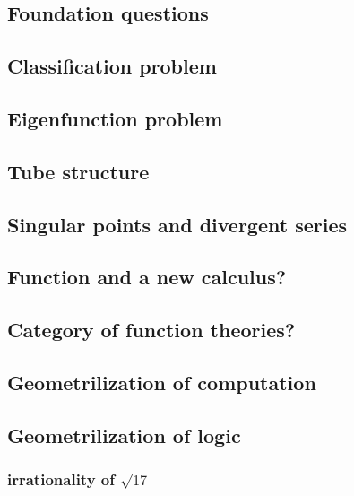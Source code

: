 
\subsection{Foundation questions}\label{sec:foundation}

\subsection{Classification problem}\label{sec:donaghey}

\subsection{Eigenfunction problem}\label{sec:eigenfunction}

\subsection{Tube structure}\label{sec:tube}

\subsection{Singular points and divergent series}\label{sec:singularity}

\subsection{Function and a new calculus?}\label{sec:caculus}

\subsection{Category of function theories?}\label{sec:function}

\subsection{Geometrilization of computation}\label{sec:computation}

\subsection{Geometrilization of logic}\label{sec:logic}
\subsubsection{irrationality of $\sqrt{17}$}

